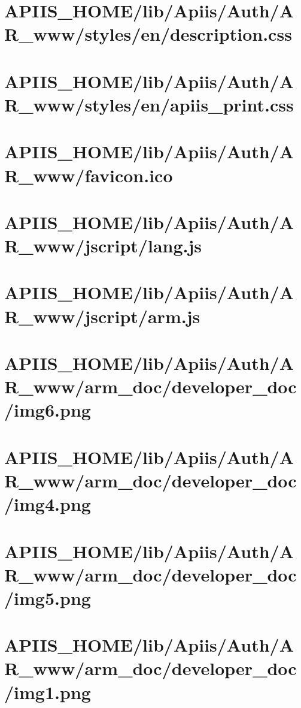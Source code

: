 \section{APIIS\_HOME/lib/Apiis/Auth/AR_www/styles/en/description.css} 
\section{APIIS\_HOME/lib/Apiis/Auth/AR_www/styles/en/apiis\_print.css} 
\section{APIIS\_HOME/lib/Apiis/Auth/AR_www/favicon.ico} 
\section{APIIS\_HOME/lib/Apiis/Auth/AR_www/jscript/lang.js} 
\section{APIIS\_HOME/lib/Apiis/Auth/AR_www/jscript/arm.js} 
\section{APIIS\_HOME/lib/Apiis/Auth/AR_www/arm_doc/developer_doc/img6.png} 
\section{APIIS\_HOME/lib/Apiis/Auth/AR_www/arm_doc/developer_doc/img4.png} 
\section{APIIS\_HOME/lib/Apiis/Auth/AR_www/arm_doc/developer_doc/img5.png} 
\section{APIIS\_HOME/lib/Apiis/Auth/AR_www/arm_doc/developer_doc/img1.png} 
